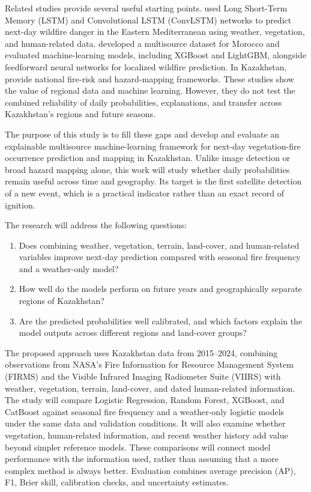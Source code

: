 \documentclass[pdflatex,sn-mathphys-num]{sn-jnl}
\begin{document}
Related studies provide several useful starting points. \cite{kondylatos2022danger} used Long Short-Term Memory (LSTM) and Convolutional LSTM (ConvLSTM) networks to predict next-day wildfire danger in the Eastern Mediterranean using weather, vegetation, and human-related data. \cite{jadouli2024morocco} developed a multisource dataset for Morocco and evaluated machine-learning models, including XGBoost and LightGBM, alongside feedforward neural networks for localized wildfire prediction. In Kazakhstan, \cite{babu2025sfri,chepashev2025maxent} provide national fire-risk and hazard-mapping frameworks. These studies show the value of regional data and machine learning. However, they do not test the combined reliability of daily probabilities, explanations, and transfer across Kazakhstan's regions and future seasons.

The purpose of this study is to fill these gaps and develop and evaluate an explainable multisource machine-learning framework for next-day vegetation-fire occurrence prediction and mapping in Kazakhstan. Unlike image detection or broad hazard mapping alone, this work will study whether daily probabilities remain useful across time and geography. Its target is the first satellite detection of a new event, which is a practical indicator rather than an exact record of ignition. 

The research will address the following questions:
\begin{enumerate}
\item Does combining weather, vegetation, terrain, land-cover, and human-related variables improve next-day prediction compared with seasonal fire frequency and a weather-only model?
\item How well do the models perform on future years and geographically separate regions of Kazakhstan?
\item Are the predicted probabilities well calibrated, and which factors explain the model outputs across different regions and land-cover groups?
\end{enumerate}

The proposed approach uses Kazakhstan data from 2015--2024, combining observations from NASA's Fire Information for Resource Management System (FIRMS) and the Visible Infrared Imaging Radiometer Suite (VIIRS) with weather, vegetation, terrain, land-cover, and dated human-related information\cite{nasaFirmsFaq}. The study will compare Logistic Regression, Random Forest, XGBoost, and CatBoost against seasonal fire frequency and a weather-only logistic models under the same data and validation conditions. It will also examine whether vegetation, human-related information, and recent weather history add value beyond simpler reference models. These comparisons will connect model performance with the information used, rather than assuming that a more complex method is always better. Evaluation combines average precision (AP), F1, Brier skill, calibration checks, and uncertainty estimates.
\end{document}
